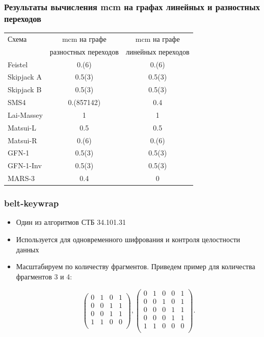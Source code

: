 \documentclass{beamer}
\begin{document}
\begin{frame}
    \frametitle{Результаты вычисления mcm на графах линейных и разностных переходов}

\begin{tabular}{ l | c | c }
  \hline			
  Схема & mcm на графе & mcm на графе \\
   & разностных переходов & линейных переходов \\
\hline
  Feistel & 0.(6) & 0.(6) \\
  Skipjack A & 0.5(3) & 0.5(3) \\
  Skipjack B & 0.5(3) & 0.5(3) \\
  SMS4 & 0.(857142) & 0.4 \\
  Lai-Massey & 1& 1 \\
  Matsui-L & 0.5 & 0.5 \\
  Matsui-R & 0.(6) & 0.(6) \\
  GFN-1 & 0.5(3) & 0.5(3) \\
  GFN-1-Inv & 0.5(3) & 0.5(3)  \\
  MARS-3 & 0.4 & 0 \\
  \hline  
\end{tabular}

  \end{frame}
\begin{frame}
\frametitle{belt-keywrap}
\begin{itemize}
\item Один из алгоритмов СТБ 34.101.31
\item Используется для одновременного шифрования и контроля целостности данных
\item Масштабируем по количеству фрагментов. Приведем пример для количества фрагментов 3 и 4:

$$
\begin{pmatrix}
0 & 1 & 0 & 1\\
0 & 0 & 1 & 1\\
0 & 0  & 1 & 1\\
1 & 1 & 0 & 0\\
\end{pmatrix}, 
\begin{pmatrix}
0 & 1 & 0 & 0 & 1\\
0 & 0 & 1 & 0 & 1\\
0 & 0 & 0 & 1 & 1\\
0 & 0 & 0 & 1 & 1\\
1 & 1 & 0 & 0 & 0\\
\end{pmatrix}.
$$


\end{itemize}
\end{frame}
\end{document}
